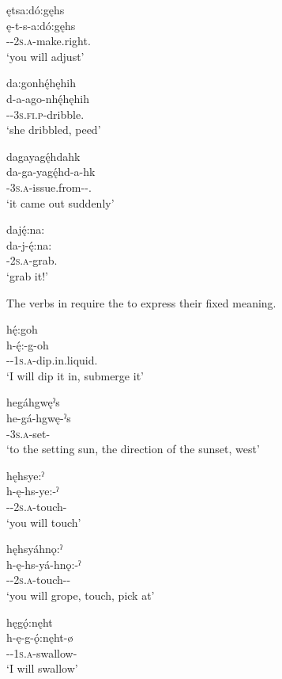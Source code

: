 \ex ętsa:dó:gęhs\\
\gll ę-t-s-a:dó:gęhs\\
\fut-{\cislocative}-\textsc{2s.a}-make.right.{\zeropunctual}\\
\glt `you will adjust'

\ex da:gonhę́hęhih\\
\gll d-a-ago-nhę́hęhih\\
{\cislocative}-{\factual}-\textsc{3s.fi.p}-dribble.{\zeropunctual}\\
\glt `she dribbled, peed'

\ex dagayagę́hdahk\\
\gll da-ga-yagę́hd-a-hk\\
{\cislocative}-\textsc{3s.a}-issue.from-{\joinerA}-{\zeropunctual.\former}\\
\glt `it came out suddenly'

\ex daję́:na:\\
\gll da-j-ę́:na:\\
{\cislocative}-\textsc{2s.a}-grab.{\noaspect}\\
\glt `grab it!'
\z
\z

The verbs in  require the  \textsc{\translocative} to express their fixed meaning.

\ea\label{ex:dhex16}

\ea hę́:goh\\
\gll h-ę́:-g-oh\\
{\translocative}-{\future}-\textsc{1s.a}-dip.in.\-liquid.{\zeropunctual}\\
\glt `I will dip it in, submerge it'

\ex hegáhgwęˀs\\
\gll he-gá-hgwę-ˀs\\
{\translocative}-\textsc{3s.a}-set-{\habitual}\\
\glt `to the setting sun, the direction of the sunset, west'

\ex hęhsye:ˀ\\
\gll h-ę-hs-ye:-ˀ\\
{\translocative}-{\future}-\textsc{2s.a}-touch-{\punctual}\\
\glt `you will touch'

\ex hęhsyáhnǫ:ˀ\\
\gll h-ę-hs-yá-hnǫ:-ˀ\\
{\translocative}-{\future}-\textsc{2s.a}-touch-{\distributive}-{\punctual}\\
\glt `you will grope, touch, pick at'

\newpage
\ex hęgǫ́:nęht\\
\gll h-ę-g-ǫ́:nęht-ø\\
{\translocative}-{\future}-\textsc{1s.a}-swallow-{\punctual}\\
\glt `I will swallow'

